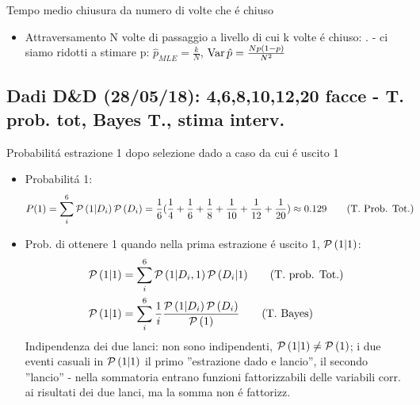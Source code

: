 \documentclass[asd-beamer.tex]{subfiles}
\begin{document}
\begin{frame}{Tempo medio chiusura da numero di volte che \'e chiuso}
\begin{itemize}
\item Attraversamento N volte di passaggio a livello di cui k volte \'e chiuso: .  - ci siamo ridotti a stimare p: $\hat{p}_{MLE}=\frac{k}{N}$, $\operatorname{Var}{\hat{p}}=\frac{Np(1-p)}{N^2}$
\end{itemize}
\end{frame}

\subsection{Dadi D\&D (28/05/18): 4,6,8,10,12,20 facce - T. prob. tot, Bayes T., stima interv.}

\begin{frame}{Probabilit\'a estrazione 1 dopo selezione dado a caso da cui \'e uscito 1}
\begin{itemize}
\item Probabilit\'a 1:
\begin{align*}
&P(1)=\sum_i^6\operatorname{\mathcal{P}}{(1|D_i)}\operatorname{\mathcal{P}}{(D_i)}=\frac{1}{6}(\frac{1}{4}+\frac{1}{6}+\frac{1}{8}+\frac{1}{10}+\frac{1}{12}+\frac{1}{20})\approx0.129\tag{T. Prob. Tot.}
\end{align*}
\item Prob. di ottenere 1 quando nella prima estrazione \'e uscito 1, $\operatorname{\mathcal{P}}{(1|1)}$:
\begin{align*}
&\operatorname{\mathcal{P}}{(1|1)}=\sum_i^6\operatorname{\mathcal{P}}{(1|D_i,1)}\operatorname{\mathcal{P}}{(D_i|1)}\tag{T. prob. Tot.}\\
&\operatorname{\mathcal{P}}{(1|1)}=\sum_i^6\frac{1}{i}\frac{\operatorname{\mathcal{P}}{(1|D_i)\operatorname{\mathcal{P}}{(D_i)}}}{\operatorname{\mathcal{P}}{(1)}}\tag{T. Bayes}
\end{align*}
Indipendenza dei due lanci: non sono indipendenti, $\operatorname{\mathcal{P}}{(1|1)}\neq\operatorname{\mathcal{P}}{(1)}$; i due eventi casuali in $\operatorname{\mathcal{P}}{(1|1)}$ il primo ''estrazione dado e lancio'', il secondo ''lancio'' - nella sommatoria entrano funzioni fattorizzabili delle variabili corr. ai risultati dei due lanci, ma la somma non \'e fattorizz.
\end{itemize}
\end{frame}
\end{document}
